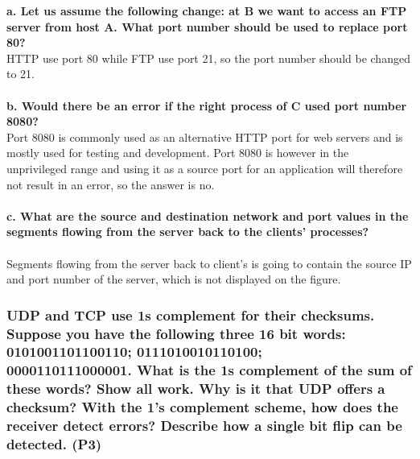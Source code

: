 \textbf{a. Let us assume the following change: at B we want to access an FTP server from host A. What port number should be used to replace port 80?} \\
HTTP use port 80 while FTP use port 21, so the port number should be changed to 21. \\
\\
\textbf{b. Would there be an error if the right process of C used port number 8080?} \\
Port 8080 is commonly used as an alternative HTTP port for web servers and is mostly used for testing and development. Port 8080 is however in the unprivileged range and using it as a source port for an application will therefore not result in an error, so the answer is no. \\
\\
\textbf{c. What are the source and destination network and port values in the segments flowing from the server back to the clients' processes?} \\
\\
Segments flowing from the server back to client's is going to contain the source IP and port number of the server, which is not displayed on the figure.


\subsubsection{UDP and TCP use 1s complement for their checksums. Suppose you have the following three 16 bit words: 0101001101100110; 0111010010110100; \\ 0000110111000001. What is the 1s complement of the sum of these words? Show all work. Why is it that UDP offers a checksum? With the 1's complement scheme, how does the receiver detect errors? Describe how a single bit flip can be detected. (P3)}

